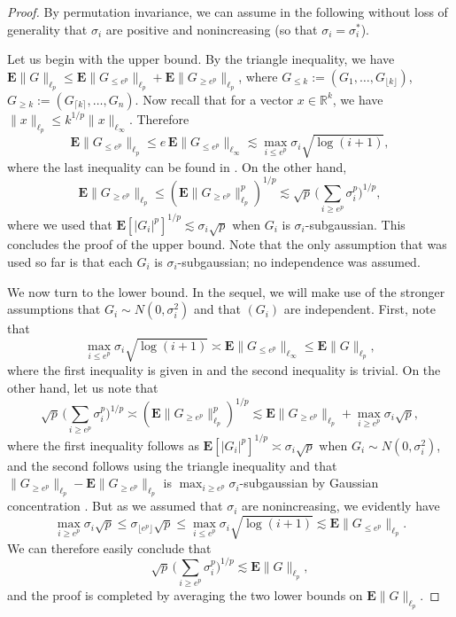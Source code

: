 \documentclass[10pt,reqno]{amsart}
\theoremstyle{definition}
\numberwithin{equation}{section}
\numberwithin{figure}{section}
\numberwithin{table}{section}
\begin{document}
\begin{proof}
By permutation invariance, we can assume in the following 
without loss of generality that $\sigma_i$ are positive and nonincreasing 
(so that $\sigma_i=\sigma_i^*$).

Let us begin with the upper bound. By the triangle inequality, we have
$\mathbf{E}\|G\|_{\ell_p}\le
\mathbf{E}\|G_{\le e^p}\|_{\ell_p} + \mathbf{E}\|G_{\ge e^p}\|_{\ell_p}$,
where $G_{\le k}:=(G_1,\ldots,G_{\lfloor k\rfloor})$, 
$G_{\ge k}:=(G_{\lceil k\rceil },\ldots,G_n)$.
Now recall that for a vector $x\in\mathbb{R}^k$, we have
$\|x\|_{\ell_p}\le k^{1/p}\|x\|_{\ell_\infty}$. Therefore
$$
	\mathbf{E}\|G_{\le e^p}\|_{\ell_p} \le
	e\,\mathbf{E}\|G_{\le e^p}\|_{\ell_\infty}
	\lesssim 
	\max_{i\le e^p}\sigma_i\sqrt{\log(i+1)},
$$
where the last inequality can be found in \cite[Lemma 2.3]{vH17}. On the 
other hand,
$$
	\mathbf{E}\|G_{\ge e^p}\|_{\ell_p} \le
	(\mathbf{E}\|G_{\ge e^p}\|_{\ell_p}^p)^{1/p} \lesssim
	\sqrt{p}\,\Bigg(\sum_{i\ge e^p} \sigma_i^p\Bigg)^{1/p},
$$
where we used that $\mathbf{E}[|G_i|^p]^{1/p}\lesssim \sigma_i\sqrt{p}$
when $G_i$ is $\sigma_i$-subgaussian. This concludes the proof of the 
upper bound. Note that the only assumption that was used so far is
that each $G_i$ is $\sigma_i$-subgaussian; no independence was assumed.

We now turn to the lower bound. In the sequel, we will make use of the 
stronger assumptions that $G_i\sim N(0,\sigma_i^2)$ and that $(G_i)$ are 
independent. First, note that
$$
	\max_{i\le e^p}\sigma_i\sqrt{\log(i+1)} \asymp
	\mathbf{E}\|G_{\le e^p}\|_{\ell_\infty} \le
	\mathbf{E}\|G\|_{\ell_p},
$$
where the first inequality is given in \cite[Lemma 2.4]{vH17} and the 
second inequality is trivial. On the other hand, let us note that
$$
	\sqrt{p}\,\Bigg(\sum_{i\ge e^p} \sigma_i^p\Bigg)^{1/p}
	\asymp
	(\mathbf{E}\|G_{\ge e^p}\|_{\ell_p}^p)^{1/p} 
	\lesssim
	\mathbf{E}\|G_{\ge e^p}\|_{\ell_p} + 
	\max_{i\ge e^p}\sigma_i\sqrt{p},
$$
where the first inequality follows as $\mathbf{E}[|G_i|^p]^{1/p}\asymp
\sigma_i\sqrt{p}$ when $G_i\sim N(0,\sigma_i^2)$, and the second 
follows using the triangle inequality and that
$\|G_{\ge e^p}\|_{\ell_p}-\mathbf{E}\|G_{\ge e^p}\|_{\ell_p}$ is 
$\max_{i\ge e^p}\sigma_i$-subgaussian by Gaussian concentration 
\cite[Theorem 5.8]{BLM13}. But as we assumed that $\sigma_i$ are 
nonincreasing, we evidently have 
$$
	\max_{i\ge e^p}\sigma_i\sqrt{p} \le
	\sigma_{\lfloor e^p\rfloor} \sqrt{p} \le
	\max_{i\le e^p}\sigma_i\sqrt{\log(i+1)} \lesssim
	\mathbf{E}\|G_{\le e^p}\|_{\ell_p}.
$$
We can therefore easily conclude that
$$
	\sqrt{p}\,\Bigg(\sum_{i\ge e^p} \sigma_i^p\Bigg)^{1/p}
	\lesssim \mathbf{E}\|G\|_{\ell_p},
$$
and the proof is completed by averaging the two lower bounds on
$\mathbf{E}\|G\|_{\ell_p}$.
\end{proof}
\end{document}
